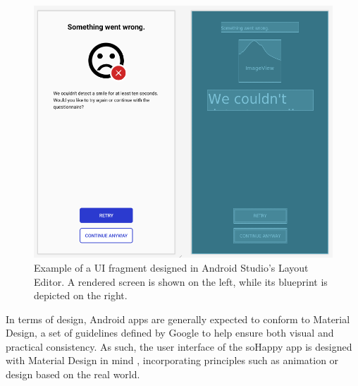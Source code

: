 \begin{figure}
  \includegraphics[width=\linewidth]{figures/user_interface.png}
  \caption{Example of a UI fragment designed in Android Studio's Layout Editor. A rendered screen is shown on the left, while its blueprint is depicted on the right.}
  \label{fig:user_interface}
\end{figure}

In terms of design, Android apps are generally expected to conform to Material Design, a set of guidelines defined by Google to help ensure both visual and practical consistency. As such, the user interface of the soHappy app is designed with Material Design in mind \cite{material_design}, incorporating principles such as animation or design based on the real world.
